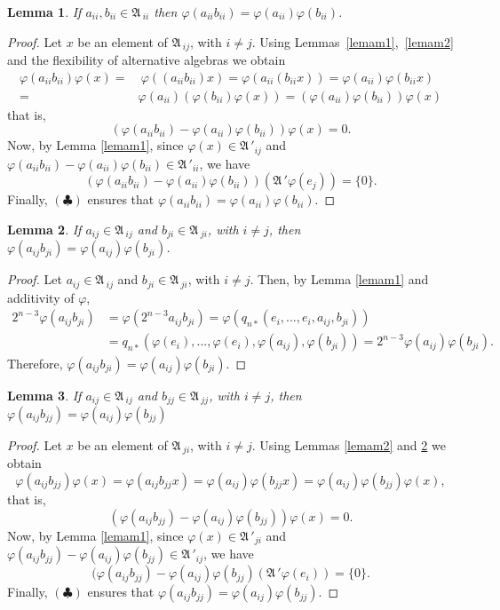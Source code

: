 \documentclass{amsart}
\newtheorem{lemma}{Lemma}[section]
\def\A{{\mathfrak A}\, }
\begin{document}
\begin{lemma}\label{lemam3}
If $a_{ii},b_{ii} \in \A_{ii}$ then $\varphi(a_{ii}b_{ii}) = \varphi(a_{ii})\varphi(b_{ii})$.
\end{lemma}
\begin{proof}
Let $x$ be an element of $\A_{ij}$, with $i \neq j$. Using Lemmas~\ref{lemam1},~\ref{lemam2} and the flexibility of alternative algebras we obtain
\begin{eqnarray*}
\varphi(a_{ii}b_{ii})\varphi(x) =& \  \varphi((a_{ii}b_{ii})x) = \varphi(a_{ii}(b_{ii}x)) = \varphi(a_{ii})\varphi(b_{ii}x) \\ =&  \varphi(a_{ii})(\varphi(b_{ii})\varphi(x)) =(\varphi(a_{ii})\varphi(b_{ii}))\varphi(x)
\end{eqnarray*}
that is,
$$
(\varphi(a_{ii}b_{ii}) - \varphi(a_{ii})\varphi(b_{ii}))\varphi(x) = 0.
$$
Now, by Lemma \ref{lemam1}, since $\varphi(x) \in \A'_{ij}$ and $\varphi(a_{ii}b_{ii}) - \varphi(a_{ii})\varphi(b_{ii}) \in \A'_{ii}$, we have
$$
(\varphi(a_{ii}b_{ii}) - \varphi(a_{ii})\varphi(b_{ii}))(\A'\varphi(e_j)) = \{0\}.
$$
Finally, $\left(\clubsuit \right)$ ensures that $\varphi(a_{ii}b_{ii}) = \varphi(a_{ii})\varphi(b_{ii})$.
\end{proof}

\begin{lemma} \label{lemam4}
If $a_{ij} \in \A_{ij}$ and $b_{ji} \in \A_{ji}$, with $i \neq j$, then $\varphi(a_{ij}b_{ji}) = \varphi(a_{ij})\varphi(b_{ji})$.
\end{lemma}
\begin{proof}
Let $a_{ij} \in \A_{ij}$ and $b_{ji} \in \A_{ji}$, with $i \neq j$. Then, by Lemma \ref{lemam1} and additivity of $\varphi$, 
$$
\begin{aligned}
2^{n-3}\varphi(a_{ij}b_{ji}) &= \varphi(2^{n-3}a_{ij}b_{ji}) = \varphi(q_{n*}(e_i,...,e_i,a_{ij},b_{ji})) \\
     &= q_{n*}(\varphi(e_i),...,\varphi(e_i),\varphi(a_{ij}),\varphi(b_{ji})) = 2^{n-3}\varphi(a_{ij})\varphi(b_{ji}).
\end{aligned}
$$
Therefore, $\varphi(a_{ij}b_{ji}) = \varphi(a_{ij})\varphi(b_{ji}).$

\end{proof}


\begin{lemma}\label{lemam5}
If $a_{ij} \in \A_{ij}$ and $b_{jj} \in \A_{jj}$, with $i \neq j$, then $\varphi(a_{ij}b_{jj}) = \varphi(a_{ij})\varphi(b_{jj})$
\end{lemma}
\begin{proof}
Let $x$ be an element of $\A_{ji}$, with $i \neq j$. Using Lemmas \ref{lemam2} and \ref{lemam4} we obtain
$$
\varphi(a_{ij}b_{jj})\varphi(x) = \varphi(a_{ij}b_{jj}x) = \varphi(a_{ij})\varphi(b_{jj}x) = \varphi(a_{ij})\varphi(b_{jj})\varphi(x),
$$
that is,
$$
(\varphi(a_{ij}b_{jj}) - \varphi(a_{ij})\varphi(b_{jj}))\varphi(x) = 0.
$$
Now, by Lemma \ref{lemam1}, since $\varphi(x) \in \A'_{ji}$ and $\varphi(a_{ij}b_{jj}) - \varphi(a_{ij})\varphi(b_{jj}) \in \A'_{ij}$, we have
$$
(\varphi(a_{ij}b_{jj}) - \varphi(a_{ij})\varphi(b_{jj})(\A'\varphi(e_i)) = \{0\}.
$$
Finally, $\left(\clubsuit \right)$ ensures that $\varphi(a_{ij}b_{jj}) = \varphi(a_{ij})\varphi(b_{jj})$.
\end{proof}
\end{document}
